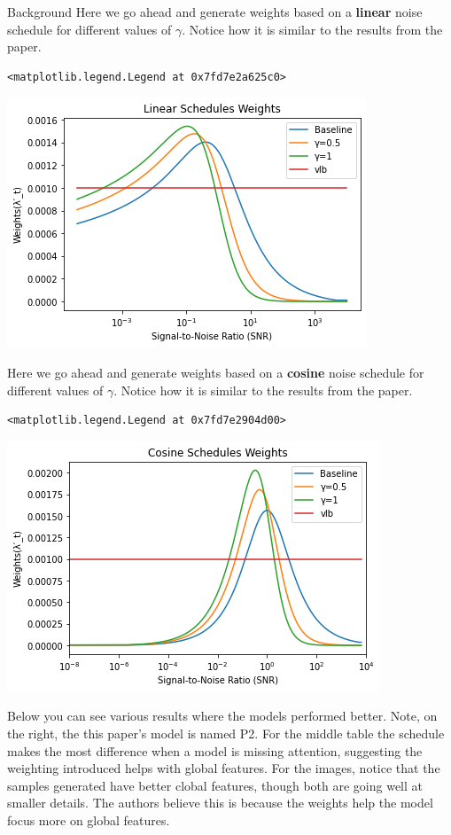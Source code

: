 \documentclass[
  ignorenonframetext,
]{beamer}
\begin{document}
\begin{frame}[fragile]{Background}
Here we go ahead and generate weights based on a \textbf{linear} noise
schedule for different values of \(\gamma\). Notice how it is similar to
the results from the paper.

\begin{verbatim}
<matplotlib.legend.Legend at 0x7fd7e2a625c0>
\end{verbatim}

\includegraphics{Perception Prioritized Training of Diffusion Models_files/figure-beamer/cell-12-output-2.png}

Here we go ahead and generate weights based on a \textbf{cosine} noise
schedule for different values of \(\gamma\). Notice how it is similar to
the results from the paper.

\begin{verbatim}
<matplotlib.legend.Legend at 0x7fd7e2904d00>
\end{verbatim}

\includegraphics{Perception Prioritized Training of Diffusion Models_files/figure-beamer/cell-13-output-2.png}

Below you can see various results where the models performed better.
Note, on the right, the this paper's model is named P2. For the middle
table the schedule makes the most difference when a model is missing
attention, suggesting the weighting introduced helps with global
features. For the images, notice that the samples generated have better
clobal features, though both are going well at smaller details. The
authors believe this is because the weights help the model focus more on
global features.


\end{frame}
\end{document}
